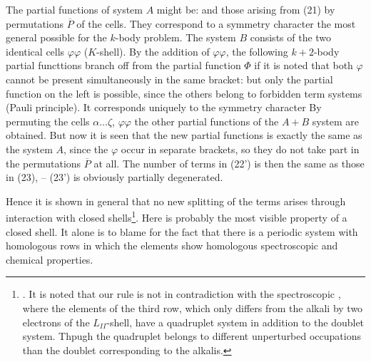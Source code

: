 \begin{paper}{1}
The partial functions of system $A$ might be:
and those arising from (21) by permutations $\overline{P}$ of the cells. They correspond to a symmetry character
the most general possible for the $k$-body problem. The system $B$ consists of the two identical cells $\varphi\varphi$ ($K$-shell). By the addition of $\varphi\varphi$, the following $k+2$-body partial functtions branch off from the partial function $\Phi$ if it is noted that both $\varphi$ cannot be present simultaneously in the same bracket:
but only the partial function on the left is possible, since the others belong to forbidden term systems (Pauli principle). It corresponds uniquely to the symmetry character
By permuting the cells $\alpha\dots\zeta$, $\varphi\varphi$ the other partial functions of the $A+B$ system are obtained. But now it is seen that the new partial functions is exactly the same as the system $A$, since the $\varphi$ occur in separate brackets, so they do not take part in the permutations $\overline{P}$ at all. The number of terms in (22') is then the same as those in (23), -- (23') is obviously partially degenerated.

Hence it is shown in general that no new splitting of the terms arises through interaction with closed shells\footnote{. It is noted that our rule is not in contradiction with the spectroscopic , where the elements of the third row, which only differs from the alkali by two electrons of the $L_{II}$-shell, have a quadruplet system in addition to the doublet system. Thpugh the quadruplet belongs to different unperturbed occupations than the doublet corresponding to the alkalis.}. Here is probably the most visible property of a closed shell. It alone is to blame for the fact that there is a periodic system with homologous rows in which the elements show homologous spectroscopic and chemical properties.


\end{paper}

